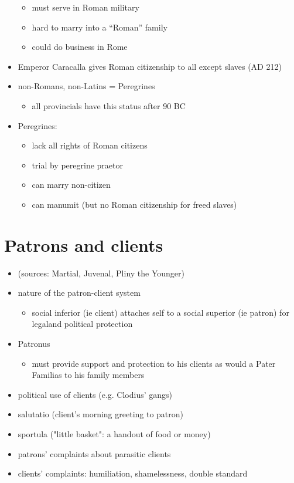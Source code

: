 \documentclass[12pt, twoside]{article}
\begin{document}
\begin{itemize}
\begin{itemize}
	\item must serve in Roman military
	\item hard to marry into a “Roman” family
	\item could do business in Rome
	\end{itemize}
\item Emperor Caracalla gives Roman citizenship to all except slaves (AD 212)
\item non-Romans, non-Latins = Peregrines 
	\begin{itemize}
	\item all provincials have this status after 90 BC
	\end{itemize}
\item Peregrines: 
	\begin{itemize}
	\item lack all rights of Roman citizens
	\item trial by peregrine praetor
	\item can marry non-citizen
	\item can manumit (but no Roman citizenship for freed slaves)
	\end{itemize}
\end{itemize}

\section {Patrons and clients}
\begin{itemize}
\item (sources: Martial, Juvenal, Pliny the Younger)
\item nature of the patron-client system
	\begin{itemize}
	\item social inferior (ie client) attaches self to a social superior (ie patron) for legaland political protection
	\end{itemize}
\item Patronus
	\begin{itemize}
	\item must provide support and protection to his clients as would a Pater Familias to his family members
	\end{itemize}
\item political use of clients (e.g. Clodius' gangs)
\item salutatio (client's morning greeting to patron)
\item sportula ("little basket": a handout of food or money)
\item patrons' complaints about parasitic clients
\item clients' complaints: humiliation, shamelessness, double standard
\end{itemize}
\end{document}

